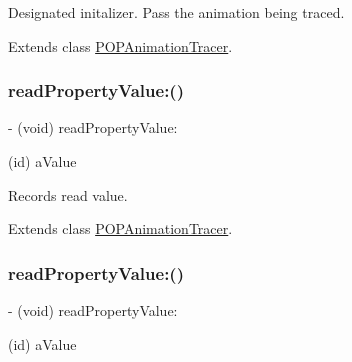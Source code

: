 Designated initalizer. Pass the animation being traced. 

Extends class \mbox{\hyperlink{interface_p_o_p_animation_tracer_a172bb65bdc4887fc5bfe4bcd38e5a5e8}{P\+O\+P\+Animation\+Tracer}}.

\mbox{\label{category_p_o_p_animation_tracer_07_internal_08_a219ed8a35e2d3fa997e5688386572f15}} 
\subsubsection{\texorpdfstring{read\+Property\+Value\+:()}{readPropertyValue:()}\hspace{0.1cm}{\footnotesize\ttfamily [1/2]}}
{\footnotesize\ttfamily -\/ (void) read\+Property\+Value\+: \begin{DoxyParamCaption}\item[{(id)}]{a\+Value }\end{DoxyParamCaption}}

Records read value. 

Extends class \mbox{\hyperlink{interface_p_o_p_animation_tracer_a219ed8a35e2d3fa997e5688386572f15}{P\+O\+P\+Animation\+Tracer}}.

\mbox{\label{category_p_o_p_animation_tracer_07_internal_08_a219ed8a35e2d3fa997e5688386572f15}} 
\subsubsection{\texorpdfstring{read\+Property\+Value\+:()}{readPropertyValue:()}\hspace{0.1cm}{\footnotesize\ttfamily [2/2]}}
{\footnotesize\ttfamily -\/ (void) read\+Property\+Value\+: \begin{DoxyParamCaption}\item[{(id)}]{a\+Value }\end{DoxyParamCaption}}

